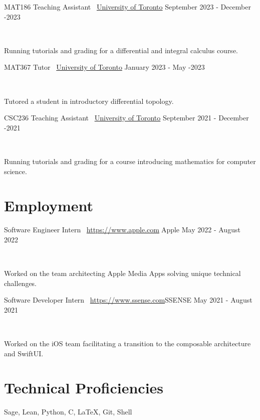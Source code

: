\documentclass[]{style}
\begin{document}
\begin{entrylist}

\vspace{1mm}

\entry
{MAT186 Teaching Assistant \ {\normalfont \underline{University of Toronto}}}
{September 2023 - December -2023}
{ ~ \vspace{-2.5mm}

Running tutorials and grading for a differential and integral calculus course.
}

\vspace{1mm}

\entry
{MAT367 Tutor \ {\normalfont \underline{University of Toronto}}}
{January 2023 - May -2023}
{ ~ \vspace{-2.5mm}

Tutored a student in introductory differential topology. 
}

\entry
{CSC236 Teaching Assistant \ {\normalfont \underline{University of Toronto}}}
{September 2021 - December -2021}
{ ~ \vspace{-2.5mm}

Running tutorials and grading for a course introducing mathematics for computer science.
}


\end{entrylist}

\section{Employment}

\begin{entrylist}

\vspace{1mm}

\entry
{Software Engineer Intern \ {\normalfont \url{https://www.apple.com}{Apple}}}
{May 2022 - August 2022}
{ ~ \vspace{-2.5mm}

Worked on the team architecting Apple Media Apps solving unique technical challenges. }

\entry
{Software Developer Intern \ {\normalfont \url{https://www.ssense.com}{SSENSE}}}
{May 2021 - August 2021}
{ ~ \vspace{-2.5mm}

Worked on the iOS team facilitating a transition to the composable architecture and SwiftUI.}

\end{entrylist}

\section{Technical Proficiencies}

Sage, Lean, Python, C, \LaTeX, Git, Shell
\end{document}
